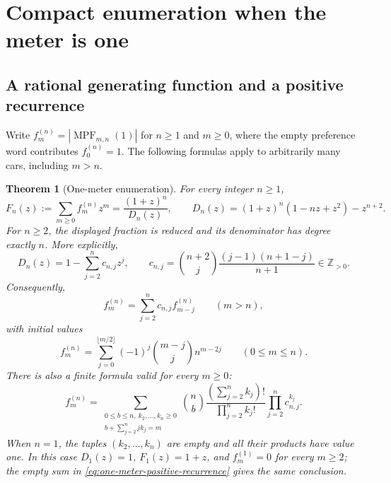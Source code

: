 \documentclass[11pt,a4paper]{article}
\newtheorem{theorem}{Theorem}[section]\newtheorem{lemma}[theorem]{Lemma}\newtheorem{corollary}[theorem]{Corollary}\newtheorem{proposition}[theorem]{Proposition}\theoremstyle{remark}\newtheorem{remark}[theorem]{Remark}\newtheorem{example}[theorem]{Example}
\begin{document}
\section{Compact enumeration when the meter is one}
\label{sec:one}

\subsection{A rational generating function and a positive recurrence}

Write $f_m^{(n)}=|\operatorname{MPF}_{m,n}(1)|$ for $n\geq1$ and $m\geq0$,
where the empty preference word contributes $f_0^{(n)}=1$.
The following formulas apply to arbitrarily many cars, including $m>n$.

\begin{theorem}[One-meter enumeration]\label{thm:one}
For every integer $n\geq1$,
\begin{equation}\label{eq:one-meter-gf}
 F_n(z):=\sum_{m\geq0}f_m^{(n)}z^m
 =\frac{(1+z)^n}{D_n(z)},\qquad
 D_n(z)=(1+z)^n(1-nz+z^2)-z^{n+2}.
\end{equation}
For $n\geq2$, the displayed fraction is reduced and its denominator has
degree exactly $n$. More explicitly,
\begin{equation}\label{eq:one-meter-positive-denominator}
 D_n(z)=1-\sum_{j=2}^{n}c_{n,j}z^j,
 \qquad
 c_{n,j}=\binom{n+2}{j}\frac{(j-1)(n+1-j)}{n+1}
 \in\mathbb Z_{>0}.
\end{equation}
Consequently,
\begin{equation}\label{eq:one-meter-positive-recurrence}
 f_m^{(n)}=\sum_{j=2}^{n}c_{n,j}f_{m-j}^{(n)}
 \qquad(m>n),
\end{equation}
with initial values
\begin{equation}\label{eq:one-meter-initial-values}
 f_m^{(n)}=
 \sum_{j=0}^{\lfloor m/2\rfloor}
 (-1)^j\binom{m-j}{j}n^{m-2j}
 \qquad(0\leq m\leq n).
\end{equation}
There is also a finite formula valid for every $m\geq0$:
\begin{equation}\label{eq:one-meter-multinomial}
 f_m^{(n)}=
 \sum_{\substack{0\leq b\leq n,\ k_2,\ldots,k_n\geq0\\
 b+\sum_{j=2}^{n}jk_j=m}}
 \binom nb
 \frac{(\sum_{j=2}^{n}k_j)!}{\prod_{j=2}^{n}k_j!}
 \prod_{j=2}^{n}c_{n,j}^{k_j}.
\end{equation}
When $n=1$, the tuples $(k_2,\ldots,k_n)$ are empty and all their
products have value one. In this case $D_1(z)=1$, $F_1(z)=1+z$, and
$f_m^{(1)}=0$ for every $m\geq2$; the empty sum in
\eqref{eq:one-meter-positive-recurrence} gives the same conclusion.
\end{theorem}
\end{document}
